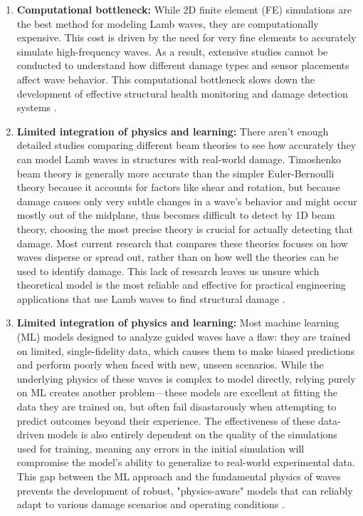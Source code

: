 \documentclass[12pt,a4paper]{report}
\begin{document}
\begin{enumerate}
    \item \textbf{Computational bottleneck:} While 2D finite element (FE) simulations are the best method for modeling Lamb waves, they are computationally expensive. This cost is driven by the need for very fine elements to accurately simulate high-frequency waves. As a result, extensive studies cannot be conducted to understand how different damage types and sensor placements affect wave behavior. This computational bottleneck slows down the development of effective structural health monitoring and damage detection systems \citep{WILLBERG2012246, SHEN2016116}.
    
    \item \textbf{Limited integration of physics and learning:} There aren't enough detailed studies comparing different beam theories to see how accurately they can model Lamb waves in structures with real-world damage. Timoshenko beam theory is generally more accurate than the simpler Euler-Bernoulli theory because it accounts for factors like shear and rotation, but because damage causes only very subtle changes in a wave's behavior and might occur mostly out of the midplane, thus becomes difficult to detect by 1D beam theory, choosing the most precise theory is crucial for actually detecting that damage. Most current research that compares these theories focuses on how waves disperse or spread out, rather than on how well the theories can be used to identify damage. This lack of research leaves us unsure which theoretical model is the most reliable and effective for practical engineering applications that use Lamb waves to find structural damage \citep{DIXIT20144341, LIMA1993449, JAIN2024118314}.
    \item \textbf{Limited integration of physics and learning:} Most machine learning (ML) models designed to analyze guided waves have a flaw: they are trained on limited, single-fidelity data, which causes them to make biased predictions and perform poorly when faced with new, unseen scenarios. While the underlying physics of these waves is complex to model directly, relying purely on ML creates another problem—these models are excellent at fitting the data they are trained on, but often fail disastarously when attempting to predict outcomes beyond their experience. The effectiveness of these data-driven models is also entirely dependent on the quality of the simulations used for training, meaning any errors in the initial simulation will compromise the model's ability to generalize to real-world experimental data. This gap between the ML approach and the fundamental physics of waves prevents the development of robust, "physics-aware" models that can reliably adapt to various damage scenarios and operating conditions \citep{Pawar2022, ROSAFALCO2021106604}.
    

\end{enumerate}
\end{document}
